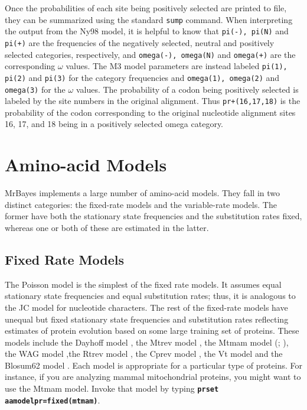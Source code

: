 \documentclass[12pt]{book}
\newcommand{\ttt}[1]{\texttt{#1}}
\newcommand{\tb}[1]{\ttt{\textbf{#1}}}
\begin{document}
Once the probabilities of each site being positively selected are printed to file, they can be
summarized using the standard \ttt{sump} command. When interpreting the output from the Ny98 model,
it is helpful to know that \ttt{pi(-), pi(N)} and \ttt{pi(+)} are the frequencies of the negatively
selected, neutral and positively selected categories, respectively, and \ttt{omega(-), omega(N)}
and \ttt{omega(+)} are the corresponding $\omega$ values. The M3 model parameters are instead
labeled \ttt{pi(1), pi(2)} and \ttt{pi(3)} for the category frequencies and \ttt{omega(1),
omega(2)} and \ttt{omega(3)} for the $\omega$ values. The probability of a codon being positively
selected is labeled by the site numbers in the original alignment. Thus \ttt{pr+(16,17,18)} is the
probability of the codon corresponding to the original nucleotide alignment sites 16, 17, and 18
being in a positively selected omega category.

\section{Amino-acid Models}
\label{amino-acidModels}

MrBayes implements a large number of amino-acid models. They fall in two distinct categories: the
fixed-rate models and the variable-rate models. The former have both the stationary state
frequencies and the substitution rates fixed, whereas one or both of these are estimated in the
latter.

\subsection{Fixed Rate Models}
The Poisson model \citep{bishop87} is the simplest of the fixed rate models. It assumes equal
stationary state frequencies and equal substitution rates; thus, it is analogous to the JC model
for nucleotide characters. The rest of the fixed-rate models have unequal but fixed stationary
state frequencies and substitution rates reflecting estimates of protein evolution based on some
large training set of proteins. These models include the Dayhoff model \citep{dayhoff78}, the Mtrev
model \citep{adachi96}, the Mtmam model (\citet{cao98}; \citet{yang98}), the WAG model
\citep{whelan01},the Rtrev model \citep{dimmic02}, the Cprev model \citep{adachi00}, the Vt model
\citep{muller00} and the Blosum62 model \citep{henikoff92}. Each model is appropriate for a
particular type of proteins. For instance, if you are analyzing mammal mitochondrial proteins, you
might want to use the Mtmam model. Invoke that model by typing \tb{prset aamodelpr=fixed(mtmam)}.
\end{document}
